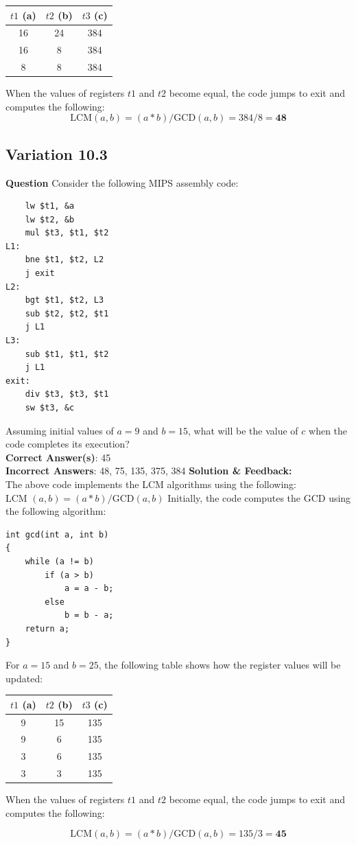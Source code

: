 \begin{center}
\begin{tabular}{|c|c|c|}
\hline
$t1$ (a) & $t2$ (b) & $t3$ (c) \\
\hline
16 & 24 & 384 \\
16 & 8  & 384 \\
8  & 8  & 384 \\
\hline
\end{tabular}
\end{center}
When the values of registers $t1$ and $t2$ become equal, the code jumps to exit and computes the following:
\[
\text{LCM} (a, b) = (a * b) / \text{GCD} (a, b) = 384 / 8 = \mathbf{48}
\]
\subsection{Variation 10.3}
\textbf{Question} 
Consider the following MIPS assembly code:
\begin{lstlisting}
    lw $t1, &a
    lw $t2, &b
    mul $t3, $t1, $t2
L1:
    bne $t1, $t2, L2
    j exit
L2:
    bgt $t1, $t2, L3
    sub $t2, $t2, $t1
    j L1
L3:
    sub $t1, $t1, $t2
    j L1
exit:
    div $t3, $t3, $t1
    sw $t3, &c
\end{lstlisting}
Assuming initial values of $a=9$ and $b=15$, what will be the value of $c$ when the code completes its execution?\\
\textbf{Correct Answer(s)}: 45 \\
\textbf{Incorrect Answers}: 48, 75, 135, 375, 384
\noindent\textbf{Solution \& Feedback:} \\
The above code implements the LCM algorithms using the following: \\
LCM $(a,b) = (a*b) / \text{GCD}(a,b)$
Initially, the code computes the GCD using the following algorithm:
\begin{lstlisting}
int gcd(int a, int b)
{
    while (a != b)
        if (a > b)
            a = a - b;
        else
            b = b - a;
    return a;
}
\end{lstlisting}
For $a=15$ and $b=25$, the following table shows how the register values will be updated:
\begin{center}
\begin{tabular}{|c|c|c|}
\hline
$t1$ (a) & $t2$ (b) & $t3$ (c) \\
\hline
9 & 15 & 135 \\
9 & 6  & 135 \\
3 & 6  & 135 \\
3 & 3  & 135 \\
\hline
\end{tabular}
\end{center}
When the values of registers $t1$ and $t2$ become equal, the code jumps to exit and computes the following:

\[
\text{LCM}(a,b) = (a*b)/\text{GCD}(a,b) = 135/3 = \mathbf{45}
\]
